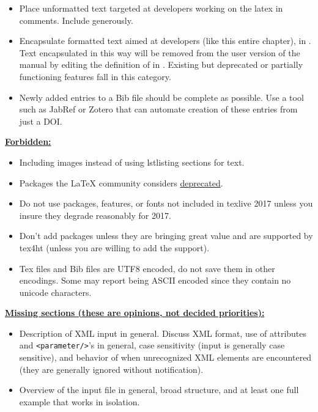 \begin{itemize}
\begin{itemize}
\end{itemize}
\item{Place unformatted text targeted at developers working on the latex in comments.  Include generously.}
\item{Encapsulate formatted text aimed at developers (like this entire chapter), in \ilatex{\\dev\{\}}.  Text encapsulated in this way will be removed from the user version of the manual by editing the definition of \ilatex{\\dev\{\}} in .  Existing but deprecated or partially functioning features fall in this category.}
\item Newly added entries to a Bib file should be complete as possible. Use a tool such as JabRef or Zotero that can automate creation of these entries from just a DOI.
\end{itemize}

\textbf{\underline{Forbidden:}}
\begin{itemize}
\item Including images instead of using lstlisting sections for text.
\item Packages the LaTeX community considers \href{https://latex.org/forum/viewtopic.php?f=37&t=6637}{deprecated}.
\item Do not use packages, features, or fonts not included in texlive 2017 unless you insure they degrade reasonably for 2017.
\item Don't add packages unless they are bringing great value and are supported by tex4ht (unless you are willing to add the support).
\item Tex files and Bib files are UTF8 encoded, do not save them in other encodings. Some may report being ASCII encoded since they contain no unicode characters.
\end{itemize}


\textbf{\underline{Missing sections (these are opinions, not decided priorities):}}
\begin{itemize}
  \item{Description of XML input in general.  Discuss XML format, use of attributes and \texttt{<parameter/>}'s in general, case sensitivity (input is generally case sensitive), and behavior of \qmcpack when unrecognized XML elements are encountered (they are generally ignored without notification).}
  \item{Overview of the input file in general, broad structure, and at least one full example that works in isolation.}
\end{itemize}


